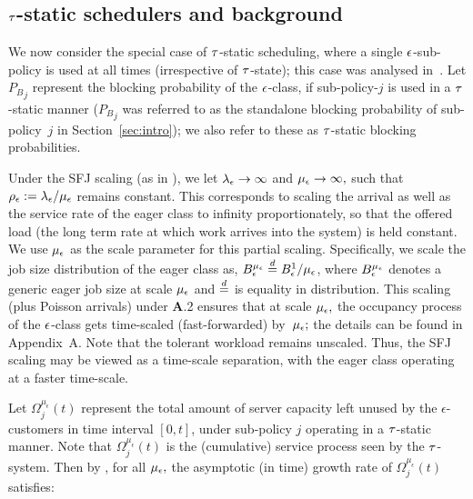\subsection{${\tau}$-static schedulers and background }
\label{sec:background}

We now consider the special case of ${\tau}$-static scheduling, where a
single ${ \epsilon }$-sub-policy is used at all times (irrespective of
${\tau}$-state); this case was analysed in~\cite{ANOR}. Let ${P_B}_j$
represent the blocking probability 
of the ${ \epsilon }$-class, if sub-policy-$ j$ is used in a ${\tau}$-static manner
(${P_B}_j$ was referred to as the standalone blocking probability of
sub-policy~$j$ in Section~\ref{sec:intro}); we also refer to these as
${\tau}$-static blocking probabilities.

%
 Under the SFJ
scaling (as in \cite{ANOR}), we let $\lambda_{ \epsilon } \rightarrow \infty$ and
$\mu_{ \epsilon } \rightarrow \infty,$ such that $\rho_{ \epsilon } := {\lambda_{ \epsilon }}/{\mu_{ \epsilon }}$
remains constant. This corresponds to scaling the arrival as well as
the service rate of the eager class to infinity proportionately, so
that the offered load (the long term rate at which work arrives into
the system) is held constant. We use $\mu_{ \epsilon }$ as the scale parameter
for this partial scaling.
%
Specifically, we scale the job size distribution of the eager class
as, $B^{\mu_{ \epsilon }}_{ \epsilon } \stackrel{d}{=} B^1_{ \epsilon }/\mu_{{ \epsilon }}$, where $B^{\mu_{ \epsilon }}_{ \epsilon }$
denotes a generic eager job size at scale $\mu_{ \epsilon }$ and $\stackrel{d}{=}$ is
equality in distribution. This scaling (plus Poisson arrivals) under
{\bf A}.2 ensures that at scale ${\mu_\epsilon},$ the occupancy process of the
${ \epsilon }$-class gets time-scaled (fast-forwarded) by~${\mu_\epsilon};$ the details
can be found in Appendix~A. Note that the tolerant workload remains
unscaled. Thus, the SFJ scaling may be viewed as a time-scale
separation, with the eager class operating at a faster time-scale.

%
 Let
$\Omega^{\mu_\epsilon}_{j}(t)$ represent the total amount of server
capacity left unused by the $\epsilon$-customers in time interval
$[0,t]$, under sub-policy $j$ operating in a ${\tau}$-static manner. Note
that $\Omega^{\mu_\epsilon}_{j}(t)$ is the (cumulative) service
process seen by the ${\tau}$-system. Then by \cite[Lemma 1]{ANOR}, for all
${\mu_\epsilon},$ the asymptotic (in time) growth rate of
$\Omega^{\mu_\epsilon}_{j}(t)$ satisfies:

